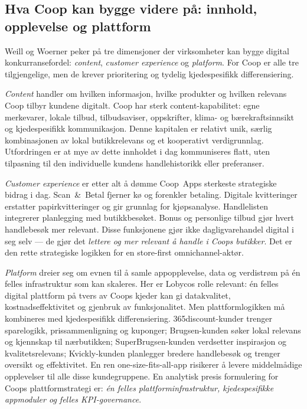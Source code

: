 \documentclass[12pt,a4paper]{article}
\begin{document}
\subsection{Hva Coop kan bygge videre på: innhold, opplevelse og plattform}

Weill og Woerner peker på tre dimensjoner der virksomheter kan bygge digital konkurransefordel: \textit{content}, \textit{customer experience} og \textit{platform}. For Coop er alle tre tilgjengelige, men de krever prioritering og tydelig kjedespesifikk differensiering.

\textit{Content} handler om hvilken informasjon, hvilke produkter og hvilken relevans Coop tilbyr kundene digitalt. Coop har sterk content-kapabilitet: egne merkevarer, lokale tilbud, tilbudsaviser, oppskrifter, klima- og bærekraftsinnsikt og kjedespesifikk kommunikasjon. Denne kapitalen er relativt unik, særlig kombinasjonen av lokal butikkrelevans og et kooperativt verdigrunnlag. Utfordringen er at mye av dette innholdet i dag kommuniseres flatt, uten tilpasning til den individuelle kundens handlehistorikk eller preferanser.

\textit{Customer experience} er etter alt å dømme Coop~Apps sterkeste strategiske bidrag i dag. Scan~\&~Betal fjerner kø og forenkler betaling. Digitale kvitteringer erstatter papirkvitteringer og gir grunnlag for kjøpsanalyse. Handlelisten integrerer planlegging med butikkbesøket. Bonus og personlige tilbud gjør hvert handlebesøk mer relevant. Disse funksjonene gjør ikke dagligvarehandel digital i seg selv --- de gjør det \textit{lettere og mer relevant å handle i Coops butikker}. Det er den rette strategiske logikken for en store-first omnichannel-aktør.

\textit{Platform} dreier seg om evnen til å samle appopplevelse, data og verdistrøm på én felles infrastruktur som kan skaleres. Her er Lobycos rolle relevant: én felles digital plattform på tvers av Coops kjeder kan gi datakvalitet, kostnadseffektivitet og gjenbruk av funksjonalitet. Men plattformlogikken må kombineres med kjedespesifikk differensiering. 365discount-kunder trenger sparelogikk, prissammenligning og kuponger; Brugsen-kunden søker lokal relevans og kjennskap til nærbutikken; SuperBrugsen-kunden verdsetter inspirasjon og kvalitetsrelevans; Kvickly-kunden planlegger bredere handlebesøk og trenger oversikt og effektivitet. En ren one-size-fits-all-app risikerer å levere middelmådige opplevelser til alle disse kundegruppene. En analytisk presis formulering for Coops plattformstrategi er: \textit{én felles plattforminfrastruktur, kjedespesifikke appmoduler og felles KPI-governance}.
\end{document}
